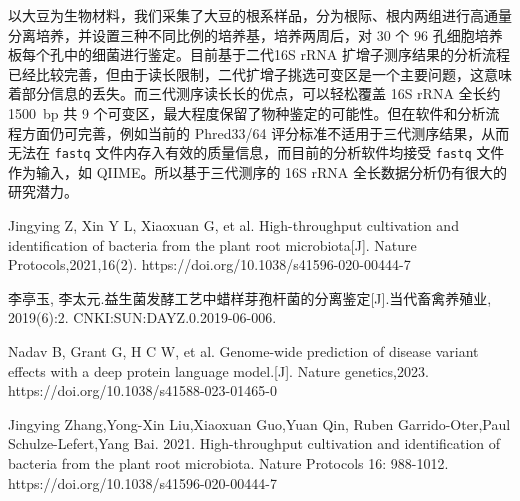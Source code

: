 \documentclass[UTF8]{ctexart}
\begin{document}
    以大豆为生物材料，我们采集了大豆的根系样品，分为根际、根内两组进行高通量分离培养，并设置三种不同比例的培养基，培养两周后，对 30 个 96 孔细胞培养板每个孔中的细菌进行鉴定。目前基于二代16S rRNA 扩增子测序结果的分析流程已经比较完善，但由于读长限制，二代扩增子挑选可变区是一个主要问题，这意味着部分信息的丢失。而三代测序读长长的优点，可以轻松覆盖 16S rRNA 全长约 1500~bp 共 9 个可变区，最大程度保留了物种鉴定的可能性。但在软件和分析流程方面仍可完善，例如当前的 Phred33/64 评分标准不适用于三代测序结果，从而无法在 \verb|fastq| 文件内存入有效的质量信息，而目前的分析软件均接受 \verb|fastq| 文件作为输入，如 QIIME。所以基于三代测序的 16S rRNA 全长数据分析仍有很大的研究潜力。


    \begin{thebibliography}{0}
         Jingying Z, Xin Y L, Xiaoxuan G, et al. High-throughput cultivation and identification of bacteria from the plant root microbiota[J]. Nature Protocols,2021,16(2). https://doi.org/10.1038/s41596-020-00444-7

         李亭玉, 李太元.益生菌发酵工艺中蜡样芽孢杆菌的分离鉴定[J].当代畜禽养殖业, 2019(6):2. CNKI:SUN:DAYZ.0.2019-06-006.
 
         Nadav B, Grant G, H C W, et al. Genome-wide prediction of disease variant effects with a deep protein language model.[J]. Nature genetics,2023. https://doi.org/10.1038/s41588-023-01465-0

         Jingying Zhang,Yong-Xin Liu,Xiaoxuan Guo,Yuan Qin, Ruben Garrido-Oter,Paul Schulze-Lefert,Yang Bai. 2021. High-throughput cultivation  and identification of bacteria from the plant root microbiota. Nature Protocols 16: 988-1012. https://doi.org/10.1038/s41596-020-00444-7


\end{thebibliography}
\end{document}
